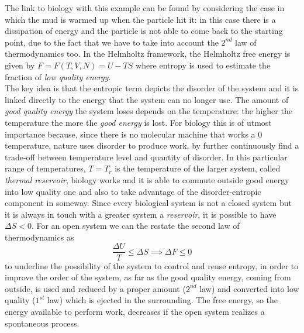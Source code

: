 \documentclass[../main/main.tex]{subfiles}
\begin{document}
The link to biology with this example can be found by considering the case in which the mud is warmed up when the particle hit it: in this case there is a dissipation of energy and the particle is not able to come back to the starting point, due to the fact that we have to take into account the $2^{nd}$ law of thermodynamics too. In the Helmholtz framework, the Helmholtz free energy is given by $F=F(T, V, N) = U-TS$ where entropy is used to estimate the fraction of \emph{low quality energy}. \\
The key idea is that the entropic term depicts the disorder of the system and it is linked directly to the energy that the system can no longer use. The amount of \emph{good quality energy} the system loses depends on the temperature: the higher the temperature the more the \emph{good energy} is lost.
For biology this is of utmost importance because, since there is no molecular machine that works a $0$ temperature, nature uses disorder to produce work, by further continuously find a trade-off between temperature level and quantity of disorder. In this particular range of temperatures, $T=T_r$ is the temperature of the larger system, called \emph{thermal reservoir}, biology works and it is able to commute outside good energy into low quality one and also to take advantage of the disorder-entropic component in someway.
Since every biological system is not a closed system but it is always in touch with a greater system a \emph{reservoir}, it is possible to have $\Delta S <0$. 
For an open system we can the restate the second law of thermodynamics as 
\begin{equation}
    \frac{\Delta U}{T} \leq \Delta S \implies \Delta F \leq 0
\end{equation}    
to underline the possibility of the system to control and reuse entropy, in order to improve the order of the system, as far as the good quality energy, coming from outside, is used and reduced by a proper amount ($2^{nd}$ law) and converted into low quality ($1^{st}$ law) which is ejected in the surrounding. The free energy, so the energy available to perform work, decreases if the open system realizes a spontaneous process.
\end{document}
